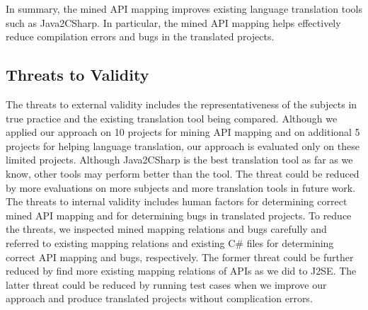In summary, the mined API mapping improves existing language
translation tools such as Java2CSharp. In particular, the mined API
mapping helps effectively reduce compilation errors and bugs in the
translated projects.


\subsection{Threats to Validity}
\label{sec:evaluation:threats} The threats to external validity
includes the representativeness of the subjects in true practice and
the existing translation tool being compared. Although we applied
our approach on 10 projects for mining API mapping and on additional
5 projects for helping language translation, our approach is
evaluated only on these limited projects. Although Java2CSharp is
the best translation tool as far as we know, other tools may perform
better than the tool. The threat could be reduced by more
evaluations on more subjects and more translation tools in future
work. The threats to internal validity includes human factors for
determining correct mined API mapping and for determining bugs in
translated projects. To reduce the threats, we inspected mined
mapping relations and bugs carefully and referred to existing
mapping relations and existing C\# files for determining correct API
mapping and bugs, respectively. The former threat could be further
reduced by find more existing mapping relations of APIs as we did to
J2SE. The latter threat could be reduced by running test cases when
we improve our approach and produce translated projects without
complication errors.
